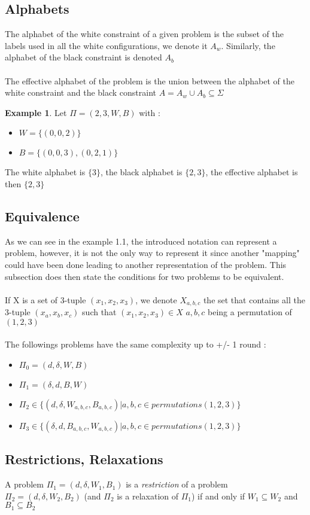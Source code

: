 \documentclass{article}
\theoremstyle{definition}
\newtheorem{exmp}{Example}[section]
\newcommand{\wdd}[0]{d}
\newcommand{\bdd}[0]{\delta}
\begin{document}
\subsection{Alphabets}
The alphabet of the white constraint of a given problem is the subset of the labels used in all the white configurations, we denote it $A_w$. Similarly, the alphabet of the black constraint is denoted $A_b$\\\\
The effective alphabet of the problem is the union between the alphabet of the white constraint and the black constraint $A = A_w \cup A_b \subseteq \Sigma$
\newpage
\begin{exmp}
Let $\Pi = (2,3,W,B)$ with :
\begin{itemize}
    \item $W = \{(0,0,2)\}$
    \item $B = \{(0,0,3),(0,2,1)\}$
\end{itemize}
The white alphabet is $\{3\}$, the black alphabet is $\{2,3\}$, the effective alphabet is then $\{2,3\}$
\end{exmp}
\subsection{Equivalence}
As we can see in the example 1.1, the introduced notation can represent a problem, however, it is not the only way to represent it since another "mapping" could have been done leading to another representation of the problem. This subsection does then state the conditions for two problems to be equivalent.\\\\
If X is a set of 3-tuple $(x_1,x_2, x_3)$, we denote $X_{a,b,c}$ the set that contains all the 3-tuple $(x_a,x_b, x_c)$ such that $(x_1,x_2, x_3)\in X$  $a,b,c$ being a permutation of $(1,2,3) $\\\\
The followings problems have the same complexity up to +/- 1 round : 
\begin{itemize}
    \item $\Pi_0 = (\wdd,\bdd,W,B)$
    \item $\Pi_1 = (\bdd,\wdd,B,W)$
    \item $\Pi_2 \in \{(\wdd,\bdd,W_{a,b,c},B_{a,b,c}) | a,b,c \in permutations(1,2,3)\}$
    \item $\Pi_3 \in \{(\bdd,\wdd,B_{a,b,c},W_{a,b,c}) | a,b,c \in permutations(1,2,3)\}$
\end{itemize}
\subsection{Restrictions, Relaxations}
A problem $\Pi_1 = (\wdd,\bdd,W_1,B_1)$ is a \textit{restriction} of a problem $\Pi_2 = (\wdd,\bdd,W_2,B_2)$ (and $\Pi_2$ is a relaxation of $\Pi_1$) if and only if $W_1\subseteq W_2$ and $B_1\subseteq B_2$
\end{document}
